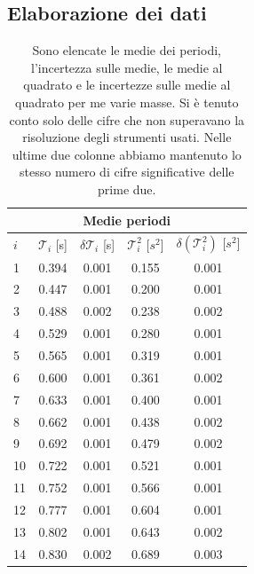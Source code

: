 \subsection{Elaborazione dei dati}

\begin{table}
    \centering
	\begin{tabular}{l c  c  c  c }
        \multicolumn{5}{c}{\textbf{Medie periodi}} \\
        \toprule
        $i$ & $\mathcal{T}_i$ [s] & $\delta\mathcal{T}_i$ [s] & $\mathcal{T}_i^2$ [$s^2$] & $\delta(\mathcal{T}_i^2)$ [$s^2$] \\

        \midrule

        1 & 0.394		& 0.001		& 0.155		& 0.001	\\
        2 & 0.447		& 0.001		& 0.200		& 0.001	\\
        3 & 0.488		& 0.002		& 0.238		& 0.002	\\
        4 & 0.529		& 0.001		& 0.280		& 0.001	\\
        5 & 0.565		& 0.001		& 0.319		& 0.001	\\
        6 & 0.600		& 0.001		& 0.361		& 0.002	\\
        7 & 0.633		& 0.001		& 0.400		& 0.001	\\
        8 & 0.662		& 0.001		& 0.438		& 0.002	\\
        9 & 0.692		& 0.001		& 0.479		& 0.002	\\
        10 & 0.722		& 0.001		& 0.521		& 0.001	\\
        11 & 0.752		& 0.001		& 0.566		& 0.001	\\
        12 & 0.777		& 0.001		& 0.604		& 0.001	\\
        13 & 0.802		& 0.001		& 0.643		& 0.002	\\
        14 & 0.830		& 0.002		& 0.689		& 0.003	\\

        \bottomrule

	\end{tabular}
    \caption{Sono elencate le medie dei periodi, l'incertezza sulle medie, le medie al quadrato e le incertezze sulle medie
    al quadrato per me varie masse. Si è tenuto conto solo delle cifre che non superavano la risoluzione degli strumenti usati.
    Nelle ultime due colonne abbiamo mantenuto lo stesso numero di cifre significative delle prime due.}
    \label{tab:calcolati}
\end{table}

